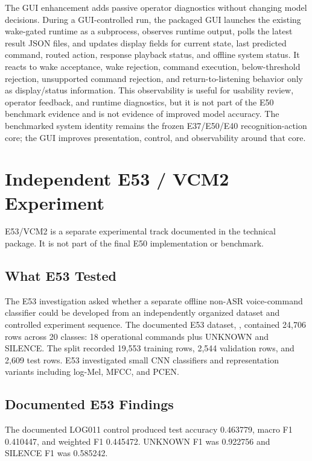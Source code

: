 \documentclass[11pt]{article}
\newcommand{\code}[1]{\texttt{\detokenize{#1}}}
\begin{document}
The GUI enhancement adds passive operator diagnostics without changing model decisions. During a GUI-controlled run, the packaged GUI launches the existing wake-gated runtime as a subprocess, observes runtime output, polls the latest result JSON files, and updates display fields for current state, last predicted command, routed action, response playback status, and offline system status. It reacts to wake acceptance, wake rejection, command execution, below-threshold rejection, unsupported command rejection, and return-to-listening behavior only as display/status information. This observability is useful for usability review, operator feedback, and runtime diagnostics, but it is not part of the E50 benchmark evidence and is not evidence of improved model accuracy. The benchmarked system identity remains the frozen E37/E50/E40 recognition-action core; the GUI improves presentation, control, and observability around that core.

\section{Independent E53 / VCM2 Experiment}

E53/VCM2 is a separate experimental track documented in the technical package. It is not part of the final E50 implementation or benchmark.

\subsection{What E53 Tested}

The E53 investigation asked whether a separate offline non-ASR voice-command classifier could be developed from an independently organized dataset and controlled experiment sequence. The documented E53 dataset, \code{E53_DATASET_V1}, contained 24,706 rows across 20 classes: 18 operational commands plus UNKNOWN and SILENCE. The split recorded 19,553 training rows, 2,544 validation rows, and 2,609 test rows. E53 investigated small CNN classifiers and representation variants including log-Mel, MFCC, and PCEN.

\subsection{Documented E53 Findings}

The documented LOG011 control produced test accuracy 0.463779, macro F1 0.410447, and weighted F1 0.445472. UNKNOWN F1 was 0.922756 and SILENCE F1 was 0.585242.
\end{document}
